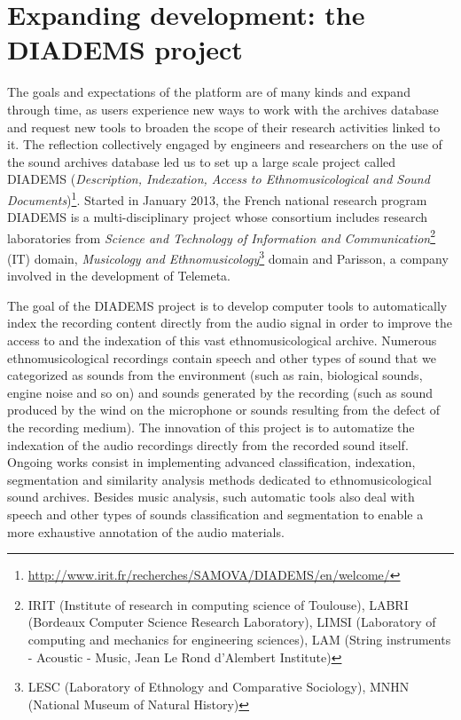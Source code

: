 \documentclass{sig-alternate}
\newcommand{\comment}[1]{\footnote{\color{red} \bf{{#1}}}}
\begin{document}
\section{Expanding development: the DIADEMS project}\label{sec:Diadems}

The goals and expectations of the platform are of many kinds and expand through time, as users experience new ways to work with the archives database and request new tools to broaden the scope of their research activities linked to it. The reflection collectively engaged by engineers and researchers on the use of the sound archives database led us  to set up a large scale project called DIADEMS (\emph{Description, Indexation, Access to Ethnomusicological and Sound Documents})\footnote{\url{http://www.irit.fr/recherches/SAMOVA/DIADEMS/en/welcome/}}. 
Started in January 2013, the French national research program DIADEMS is a multi-disciplinary project whose consortium includes research laboratories from \emph{ Science and Technology of Information and Communication}\footnote{IRIT (Institute of research in computing science of Toulouse), LABRI (Bordeaux Computer Science Research Laboratory), LIMSI (Laboratory of computing and mechanics for engineering sciences), LAM (String instruments - Acoustic - Music, Jean Le Rond d'Alembert Institute)} (IT) domain, \emph{Musicology and Ethnomusicology}\footnote{LESC (Laboratory of Ethnology and Comparative Sociology), MNHN (National Museum of Natural History)} domain and Parisson, a company involved in the development of Telemeta.
 
The goal of the DIADEMS project is to develop computer tools to automatically index the recording content directly from the audio signal in order to improve the access to and the indexation of this vast ethnomusicological archive. Numerous ethnomusicological recordings contain speech and other types of sound that we categorized as sounds from the environment (such as rain, biological sounds, engine noise and so on) and sounds generated by the recording (such as sound produced by the wind on the microphone or sounds resulting from the defect of the recording medium). The innovation of this project is to automatize the indexation of the audio recordings directly from the recorded sound itself. Ongoing works consist in implementing advanced classification, indexation, segmentation and similarity analysis methods dedicated to ethnomusicological sound archives.  Besides music analysis, such automatic tools also deal with speech and other types of sounds classification and segmentation to enable a more exhaustive annotation of the audio materials.
\end{document}
